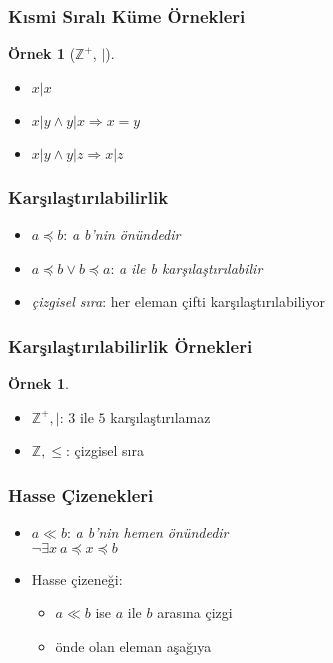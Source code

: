 \documentclass[dvipsnames]{beamer}
\theoremstyle{definition}
\theoremstyle{example}
\newtheorem{ornek}[theorem]{Örnek}
\theoremstyle{plain}
\begin{document}
\begin{frame}
  \frametitle{Kısmi Sıralı Küme Örnekleri}

  \begin{ornek}[$\mathbb{Z}^+$, $|$]
    \begin{itemize}
      \item $x | x$
      \item $x | y \wedge y | x \Rightarrow x = y$
      \item $x | y \wedge y | z \Rightarrow x | z$
    \end{itemize}
  \end{ornek}
\end{frame}

\begin{frame}
  \frametitle{Karşılaştırılabilirlik}

  \begin{itemize}
    \item $a \preceq b$: \emph{a b'nin önündedir}

    \medskip
    \item $a \preceq b \vee b \preceq a$: \emph{a ile b karşılaştırılabilir}

    \pause
    \bigskip
    \item \emph{çizgisel sıra}: her eleman çifti karşılaştırılabiliyor
  \end{itemize}
\end{frame}

\begin{frame}
  \frametitle{Karşılaştırılabilirlik Örnekleri}

  \begin{ornek}
    \begin{itemize}
      \item $\mathbb{Z}^+,|$: $3$ ile $5$ karşılaştırılamaz

      \pause
      \medskip
      \item $\mathbb{Z},\leq$: çizgisel sıra
    \end{itemize}
  \end{ornek}
\end{frame}

\begin{frame}
  \frametitle{Hasse Çizenekleri}

  \begin{itemize}
    \item $a \ll b$: \emph{a b'nin hemen önündedir}\\
      $\neg \exists x~ a \preceq x \preceq b$

    \pause
    \medskip
    \item Hasse çizeneği:
    \begin{itemize}
      \item $a \ll b$ ise $a$ ile $b$ arasına çizgi
      \item önde olan eleman aşağıya
    \end{itemize}
  \end{itemize}
\end{frame}
\end{document}
